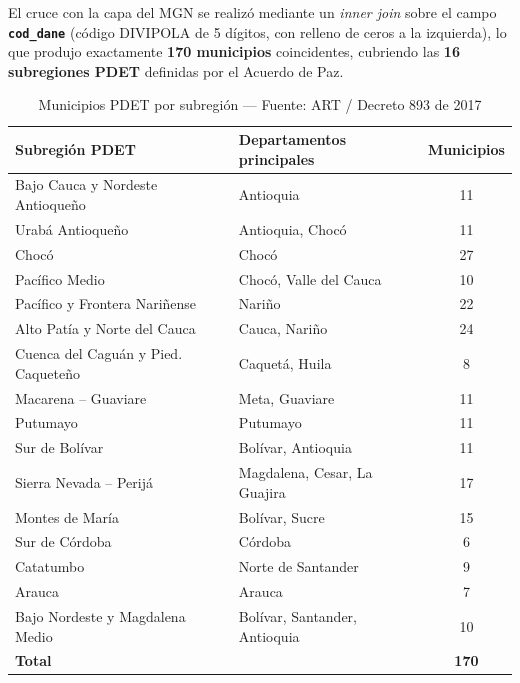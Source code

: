 \documentclass[12pt, a4paper]{report}
\begin{document}
El cruce con la capa del MGN se realizó mediante un \emph{inner join} sobre
el campo \textbf{\texttt{cod\_dane}} (código DIVIPOLA de 5 dígitos, con
relleno de ceros a la izquierda), lo que produjo exactamente
\textbf{170 municipios} coincidentes, cubriendo las
\textbf{16 subregiones PDET} definidas por el Acuerdo de Paz.

\begin{table}[H]
  \centering
  \caption{Municipios PDET por subregión — Fuente: ART / Decreto 893 de 2017}
  \label{tab:pdet_subregiones}
  \begin{tabular}{llc}
    \toprule
    \textbf{Subregión PDET} & \textbf{Departamentos principales} & \textbf{Municipios} \\
    \midrule
    Bajo Cauca y Nordeste Antioqueño    & Antioquia                          & 11 \\
    Urabá Antioqueño                    & Antioquia, Chocó                   & 11 \\
    Chocó                               & Chocó                              & 27 \\
    Pacífico Medio                      & Chocó, Valle del Cauca             & 10 \\
    Pacífico y Frontera Nariñense       & Nariño                             & 22 \\
    Alto Patía y Norte del Cauca        & Cauca, Nariño                      & 24 \\
    Cuenca del Caguán y Pied. Caqueteño & Caquetá, Huila                     &  8 \\
    Macarena -- Guaviare                & Meta, Guaviare                     & 11 \\
    Putumayo                            & Putumayo                           & 11 \\
    Sur de Bolívar                      & Bolívar, Antioquia                 & 11 \\
    Sierra Nevada -- Perijá             & Magdalena, Cesar, La Guajira       & 17 \\
    Montes de María                     & Bolívar, Sucre                     & 15 \\
    Sur de Córdoba                      & Córdoba                            &  6 \\
    Catatumbo                           & Norte de Santander                 &  9 \\
    Arauca                              & Arauca                             &  7 \\
    Bajo Nordeste y Magdalena Medio     & Bolívar, Santander, Antioquia      & 10 \\
    \midrule
    \textbf{Total}                      &                                    & \textbf{170} \\
    \bottomrule
  \end{tabular}
\end{table}
\end{document}
